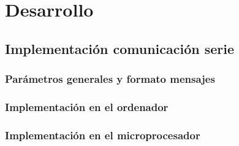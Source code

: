 \chapter{Desarrollo}
\section{Implementación comunicación serie}
\subsection{Parámetros generales y formato mensajes}
\subsection{Implementación en el ordenador}
\subsection{Implementación en el microprocesador}